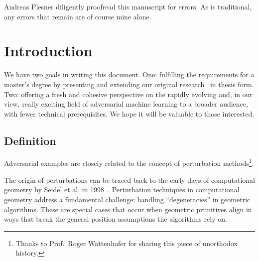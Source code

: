 \documentclass[a4paper, oneside]{discothesis}
\begin{document}
Andreas Plesner diligently proofread this manuscript for errors. As is traditional, any errors that remain are of course mine alone.

\tableofcontents

\mainmatter

\chapter{Introduction}

We have two goals in writing this document. One: fulfilling the requirements for a master's degree by presenting and extending our original research~\cite{jabary2024seeing} in thesis form. Two: offering a fresh and cohesive perspective on the rapidly evolving and, in our view, really exciting field of adversarial machine learning to a broader audience, with fewer technical prerequisites. We hope it will be valuable to those interested.

\section{Definition}

Adversarial examples are closely related to the concept of perturbation methods\footnote{Thanks to Prof.\ Roger Wattenhofer for sharing this piece of unorthodox history.}.

The origin of perturbations can be traced back to the early days of computational geometry by Seidel et al. in 1998~\cite{seidel1998nature}. Perturbation techniques in computational geometry address a fundamental challenge: handling ``degeneracies'' in geometric algorithms. These are special cases that occur when geometric primitives align in ways that break the general position assumptions the algorithms rely on.
\end{document}
